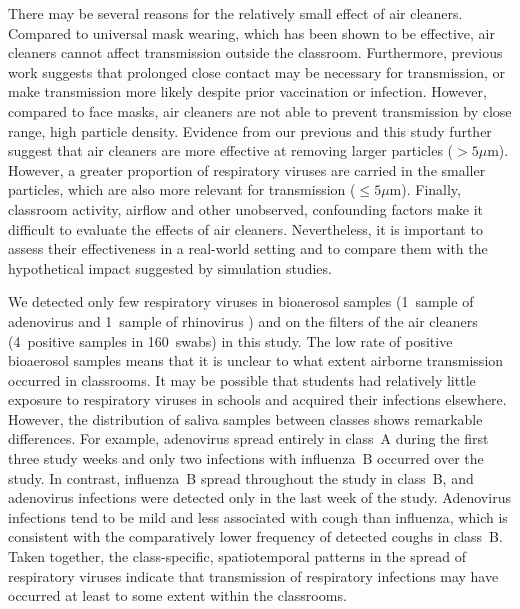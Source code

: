 \documentclass[fleqn,11pt]{wlscirep}
\begin{document}

There may be several reasons for the relatively small effect of air cleaners. Compared to \eg universal mask wearing, which has been shown to be effective\cite{Banholzer2023PLoSMed,Heinsohn2022,Gettings2021,Leung2020NatMed,Milton2013PLoSPathogens}, air cleaners cannot affect transmission outside the classroom. Furthermore, previous work suggests that prolonged close contact may be necessary for transmission\cite{Leung2020NatMed,Brankston2007LancetID}, or make transmission more likely despite prior vaccination or infection\cite{Lind2023NatCommun}. However, compared to face masks, air cleaners are not able to prevent transmission by close range, high particle density. Evidence from our previous\cite{Banholzer2023PLoSMed} and this study further suggest that air cleaners are more effective at removing larger particles ($>5\mu$m). However, a greater proportion of respiratory viruses are carried in the smaller particles, which are also more relevant for transmission ($\leq5\mu$m)\cite{Fennelly2020}. Finally, classroom activity, airflow and other unobserved, confounding factors make it difficult to evaluate the effects of air cleaners. Nevertheless, it is important to assess their effectiveness in a real-world setting and to compare them with the hypothetical impact suggested by simulation studies\cite{Lindsley2021,Cortellessa2023Build}.


We detected only few respiratory viruses in bioaerosol samples (1~sample of adenovirus and 1~sample of rhinovirus ) and on the filters of the air cleaners (4~positive samples in 160~swabs) in this study. The low rate of positive bioaerosol samples means that it is unclear to what extent airborne transmission occurred in classrooms. It may be possible that students had relatively little exposure to respiratory viruses in schools and acquired their infections elsewhere. However, the distribution of saliva samples between classes shows remarkable differences. For example, adenovirus spread entirely in class~A during the first three study weeks and only two infections with influenza~B occurred over the study. In contrast, influenza~B spread throughout the study in class~B, and adenovirus infections were detected only in the last week of the study. Adenovirus infections tend to be mild\cite{Kunz2010CIDR} and less associated with cough than influenza\cite{Ma2018RMV}, which is consistent with the comparatively lower frequency of detected coughs in class~B. Taken together, the class-specific, spatiotemporal patterns in the spread of respiratory viruses indicate that transmission of respiratory infections may have occurred at least to some extent within the classrooms. 
\end{document}

